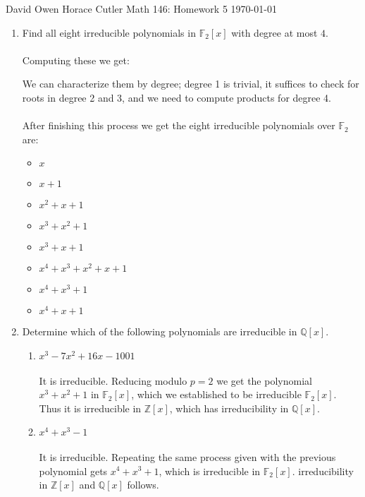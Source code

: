 \documentclass[12pt]{article}
\newenvironment{ex}[2][Exercise]{\begin{trivlist}
\item[\hskip \labelsep {\bfseries #1}\hskip \labelsep {\bfseries #2.}]}{\end{trivlist}}
\begin{document}
\noindent David Owen Horace Cutler \hfill {\Large Math 146: Homework 5} \hfill \today

\begin{ex}{1}
    \begin{enumerate}[label=(\alph*)]
        \item Find all eight irreducible polynomials in $\mathbb{F}_2[x]$ with degree at most $4$. \\ \\ Computing these we get:
        
        We can characterize them by degree; degree 1 is trivial, it suffices to check for roots in degree 2 and 3, and we need to compute products for degree 4. \\ \\ After finishing this process we get the eight irreducible polynomials over $\mathbb{F}_2$ are:
        \begin{itemize}
            \item $x$
            \item $x + 1$
            \item $x^2 + x + 1$
            \item $x^3 + x^2 + 1$
            \item $x^3 + x + 1$
            \item $x^4 + x^3 + x^2 + x + 1$
            \item $x^4 + x^3 + 1$
            \item $x^4 + x + 1$
        \end{itemize}
        \item Determine which of the following polynomials are irreducible in $\mathbb{Q}[x]$.
        \begin{enumerate}[label=(\roman*)]
            \item $x^3 - 7x^2 + 16x - 1001$
            \\ \\ It is irreducible. Reducing modulo $p = 2$ we get the polynomial $x^3 + x^2 + 1$ in $\mathbb{F}_2[x]$, which we established to be irreducible $\mathbb{F}_2[x]$. Thus it is irreducible in $\mathbb{Z}[x]$, which has irreducibility in $\mathbb{Q}[x]$. \\ 
            \item $x^4 + x^3 - 1$
            \\ \\ It is irreducible. Repeating the same process given with the previous polynomial gets $x^4 + x^3 + 1$, which is irreducible in $\mathbb{F}_2[x]$. irreducibility in $\mathbb{Z}[x]$ and $\mathbb{Q}[x]$ follows. \\

\end{enumerate}
\end{enumerate}
\end{ex}
\end{document}
